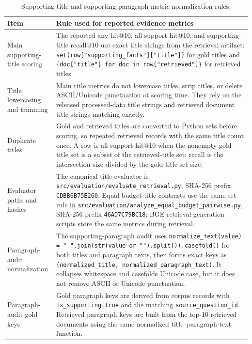 \documentclass[10pt]{article}
\begin{document}
\begin{table}[t]
\centering
\caption{Supporting-title and supporting-paragraph metric normalization rules.}
\label{tab:supporting_evidence_metric_definition}
\scriptsize
\begin{threeparttable}
\setlength{\tabcolsep}{4pt}
\begin{tabularx}{\textwidth}{>{\raggedright\arraybackslash}p{}
                            >{\raggedright\arraybackslash}X}
\toprule
Item & Rule used for reported evidence metrics \\
\midrule
Main supporting-title scoring & The reported any-hit@10, all-support hit@10, and supporting-title recall@10 use exact title strings from the retrieval artifact: \texttt{set(row["supporting\_facts"]["title"])} for gold titles and \texttt{\{doc["title"] for doc in row["retrieved"]\}} for retrieved titles. \\
Title lowercasing and trimming & Main title metrics do not lowercase titles, strip titles, or delete ASCII/Unicode punctuation at scoring time. They rely on the released processed-data title strings and retrieved document title strings matching exactly. \\
Duplicate titles & Gold and retrieved titles are converted to Python sets before scoring, so repeated retrieved records with the same title count once. A row is all-support hit@10 when the nonempty gold-title set is a subset of the retrieved-title set; recall is the intersection size divided by the gold-title set size. \\
Evaluator paths and hashes & The canonical title evaluator is \texttt{src/evaluation/evaluate\_retrieval.py}, SHA-256 prefix \texttt{CDBB6B75E260}. Equal-budget title contrasts use the same set rule in \texttt{src/evaluation/analyze\_equal\_budget\_pairwise.py}, SHA-256 prefix \texttt{46AD7C79BC18}; BGE retrieval-generation scripts store the same metrics during retrieval. \\
Paragraph-audit normalization & The supporting-paragraph audit uses \texttt{normalize\_text(value) = " ".join(str(value or "").split()).casefold()} for both titles and paragraph texts, then forms exact keys as \texttt{(normalized\_title, normalized\_paragraph\_text)}. It collapses whitespace and casefolds Unicode case, but it does not remove ASCII or Unicode punctuation. \\
Paragraph-audit gold keys & Gold paragraph keys are derived from corpus records with \texttt{is\_supporting=true} and the matching \texttt{source\_question\_id}. Retrieved paragraph keys are built from the top-10 retrieved documents using the same normalized title--paragraph-text function. \\

\end{tabularx}
\end{threeparttable}
\end{table}
\end{document}
